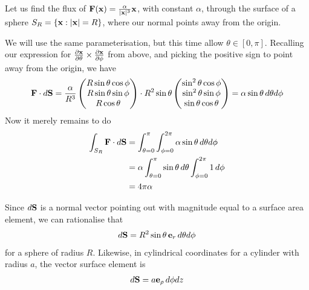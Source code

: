 \documentclass{../../template/note}
\begin{document}
    
    \begin{example*}
        Let us find the flux of \(\V F(\V x) = \frac{\alpha}{|\V x|^3} \V x\), with constant \(\alpha\), through the surface of a sphere \(S_R = \{\V x: |\V x| = R\}\), where our normal points away from the origin.

        We will use the same parameterisation, but this time allow \(\theta \in [0, \pi]\). Recalling our expression for \(\pd{\V x}\theta \times \pd{\V x}\phi\) from above, and picking the positive sign to point away from the origin, we have
        \begin{align*}
            \V F \cdot d \V S = \frac{\alpha}{R^3} \begin{pmatrix}
             R \sin \theta \cos \phi \\
             R \sin \theta \sin \phi \\
             R \cos \theta \\
            \end{pmatrix} \cdot R^2 \sin \theta \begin{pmatrix}
             \sin^2 \theta \cos \phi \\
             \sin^2 \theta \sin \phi \\
             \sin \theta \cos \theta \\
            \end{pmatrix} = \alpha \sin \theta \D \theta d\phi
        \end{align*}
        Now it merely remains to do
        \begin{align*}
            \int_{S_R} \V F \cdot d\V S &= \int_{\theta=0}^{\pi} \int_{\phi=0}^{2\pi} \alpha \sin \theta \D \theta d\phi \\
            &= \alpha \int_{\theta=0}^{\pi} \sin \theta \D \theta \int_{\phi=0}^{2\pi} 1 \D \phi \\
            &= 4\pi \alpha
        \end{align*}
    \end{example*}
    
    \begin{remark*}
        Since \(d\V S\) is a normal vector pointing out with magnitude equal to a surface area element, we can rationalise that
        \begin{align*}
            d\V S = R^2 \sin \theta \, \V e_r \D \theta d\phi
        \end{align*}
        for a sphere of radius \(R\). Likewise, in cylindrical coordinates for a cylinder with radius \(a\), the vector surface element is
        \begin{align*}
            d\V S = a \V e_\rho \D \phi dz
        \end{align*}
    \end{remark*}
    
\end{document}
